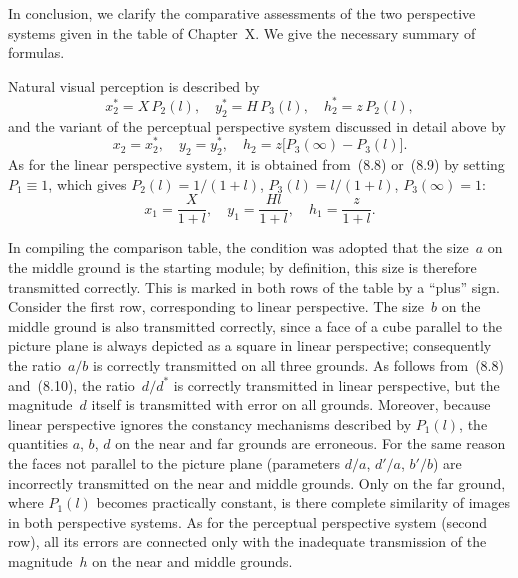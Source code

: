 In conclusion, we clarify the comparative assessments of the two perspective systems given
in the table of Chapter~X.  We give the necessary summary of formulas.

Natural visual perception is described by
\begin{equation}
  x_2^* = X\,P_2(l),\quad y_2^* = H\,P_3(l),\quad h_2^* = z\,P_2(l),  \tag{8.8}
\end{equation}
and the variant of the perceptual perspective system discussed in detail above by
\begin{equation}
  x_2 = x_2^*,\quad y_2 = y_2^*,\quad
  h_2 = z\bigl[P_3(\infty) - P_3(l)\bigr].  \tag{8.9}
\end{equation}
As for the linear perspective system, it is obtained from~(8.8) or~(8.9) by setting
$P_1 \equiv 1$, which gives $P_2(l) = 1/(1+l)$, $P_3(l) = l/(1+l)$, $P_3(\infty) = 1$:
\begin{equation}
  x_1 = \frac{X}{1+l},\quad y_1 = \frac{Hl}{1+l},\quad h_1 = \frac{z}{1+l}.  \tag{8.10}
\end{equation}

In compiling the comparison table, the condition was adopted that the size~$a$ on the
middle ground is the starting module; by definition, this size is therefore transmitted
correctly.  This is marked in both rows of the table by a ``plus'' sign.  Consider the
first row, corresponding to linear perspective.  The size~$b$ on the middle ground is also
transmitted correctly, since a face of a cube parallel to the picture plane is always
depicted as a square in linear perspective; consequently the ratio~$a/b$ is correctly
transmitted on all three grounds.  As follows from~(8.8) and~(8.10), the ratio~$d/d^*$
is correctly transmitted in linear perspective, but the magnitude~$d$ itself is transmitted
with error on all grounds.  Moreover, because linear perspective ignores the constancy
mechanisms described by $P_1(l)$, the quantities $a$, $b$, $d$ on the near and far grounds
are erroneous.  For the same reason the faces not parallel to the picture plane
(parameters $d/a$, $d'/a$, $b'/b$) are incorrectly transmitted on the near and middle
grounds.  Only on the far ground, where $P_1(l)$ becomes practically constant, is there
complete similarity of images in both perspective systems.  As for the perceptual
perspective system (second row), all its errors are connected only with the inadequate
transmission of the magnitude~$h$ on the near and middle grounds.


